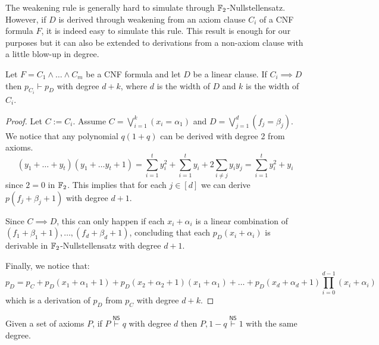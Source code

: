 \newpage

The weakening rule is generally hard to simulate through $\mathbb{F}_2$-Nullstellensatz. However, if $D$ is derived through weakening from an axiom clause $C_i$ of a CNF formula $F$, it is indeed easy to simulate this rule. This result is enough for our purposes but it can also be extended to derivations from a non-axiom clause with a little blow-up in degree. 

\begin{lemma}
    \label{weakening_ns}

 Let $F = C_1 \land \ldots \land C_m$ be a CNF formula and let $D$ be a linear clause. If $C_i \implies D$ then $p_{C_i} \vdash p_D$ with degree $d+k$, where $d$ is the width of $D$ and $k$ is the width of $C_i$.
\end{lemma}

\begin{proof}
 Let $C := C_i$. Assume $C = \bigvee_{i = 1}^k (x_i = \alpha_1)$ and $D = \bigvee_{j = 1}^d (f_j = \beta_j)$. We notice that any polynomial $q(1+q)$ can be derived with degree 2 from axioms. 
    \[(y_1 + \ldots + y_t)(y_1 + \ldots y_t + 1) = \sum_{i = 1}^t y_i^2 + \sum_{i = 1}^t y_i + 2 \sum_{i \neq j} y_i y_j = \sum_{i = 1}^t y_i^2 + y_i\]
 since $2 = 0$ in $\mathbb{F}_2$. This implies that for each $j \in [d]$ we can derive $p(f_j+\beta_j+1)$ with degree $d+1$.

 Since $C \implies D$, this can only happen if each $x_i + \alpha_i$ is a linear combination of $(f_1 + \beta_1 + 1), \ldots, (f_d + \beta_d + 1)$, concluding that each $p_D(x_i+\alpha_i)$ is derivable in $\mathbb{F}_2$-Nullstellensatz with degree $d+1$.

 Finally, we notice that:
    \[p_D = p_C + p_D(x_1+\alpha_1+1) + p_D(x_2+\alpha_2+1)(x_1+\alpha_1)+ \ldots + p_D(x_d+\alpha_d+1)\prod_{i = 0}^{d-1} (x_i+\alpha_i)\]
 which is a derivation of $p_D$ from $p_{C}$ with degree $d + k$.
    
\end{proof}

\begin{lemma}
    \label{refutation_with_negation}
 Given a set of axioms $P$, if $P \stackrel{\mathsf{NS}}{\vdash} q$ with degree $d$ then $P, 1-q \stackrel{\mathsf{NS}}{\vdash} 1$ with the same degree. 
\end{lemma}

